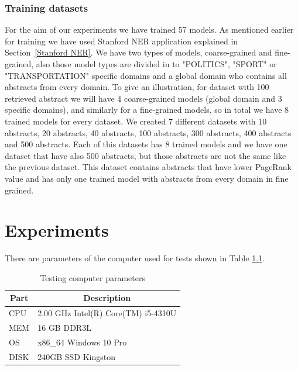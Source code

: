 \documentclass[thesis=M,english]{FITthesis}[2018/05/30]
\begin{document}
	\subsection{Training datasets}
	For the aim of our experiments we have trained 57 models. As mentioned earlier for training we have used Stanford NER application explained in Section~\ref{Stanford NER}. We have two types of models, coarse-grained and fine-grained, also those model types are divided in to "POLITICS", "SPORT" or "TRANSPORTATION" specific domains and a global domain who contains all abstracts from every domain. To give an illustration, for dataset with 100 retrieved abstract we will have 4 coarse-grained models (global domain and 3 specific domains), and similarly for a fine-grained models, so in total we have 8 trained models for every dataset. We created 7 different datasets with 10 abstracts, 20 abstracts, 40 abstracts, 100 abstracts, 300 abstracts, 400 abstracts and 500 abstracts. Each of this datasets has 8 trained models and we have one dataset that have also 500 abstracts, but those abstracts are not the same like the previous dataset. This dataset contains abstracts that have lower PageRank value and has only one trained model with abstracts from every domain in fine grained. 

 
\chapter{Experiments}

There are parameters of the computer used for tests shown in Table \ref{tab:PCparam}.
\begin{table}[H]\centering
	\caption{Testing computer parameters}
	\label{tab:PCparam}
	\begin{tabular}{|l|l|}
	\hline \multicolumn{1}{|c|}{\textbf{Part}} & \multicolumn{1}{|c|}{\textbf{Description}} \\\hline
	CPU & 2.00 GHz Intel(R) Core(TM) i5-4310U \\
	MEM & 16 GB DDR3L\\
	OS & x86\_64 Windows 10 Pro\\
	DISK & 240GB SSD Kingston\\\hline
	\end{tabular}
\end{table}
\end{document}
